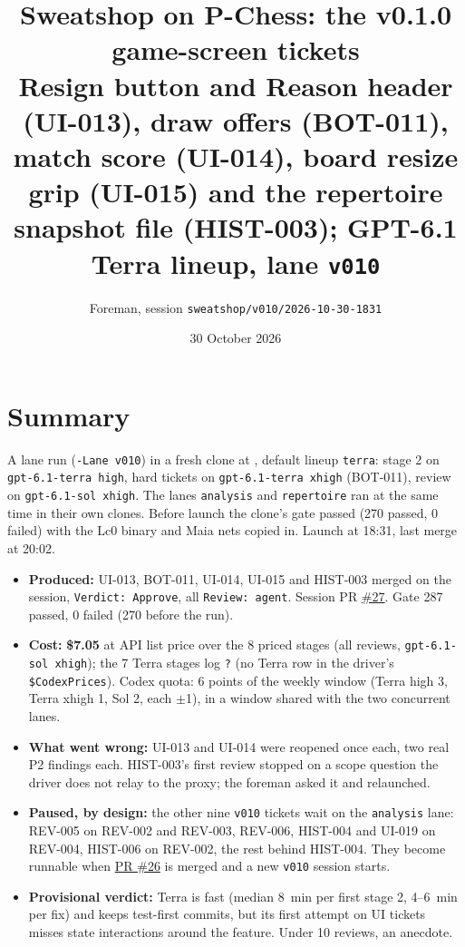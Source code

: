 \documentclass[11pt,a4paper]{article}
\title{Sweatshop on P-Chess: the v0.1.0 game-screen tickets\\\large Resign button and Reason header (UI-013), draw offers (BOT-011), match score (UI-014), board resize grip (UI-015) and the repertoire snapshot file (HIST-003); GPT-6.1 Terra lineup, lane \texttt{v010}}
\author{Foreman, session \texttt{sweatshop/v010/2026-10-30-1831}}
\date{30 October 2026}
\begin{document}
\maketitle

\section*{Summary}

A lane run (\texttt{-Lane v010}) in a fresh clone at , default
lineup \texttt{terra}: stage 2 on \texttt{gpt-6.1-terra high}, hard tickets on
\texttt{gpt-6.1-terra xhigh} (BOT-011), review on \texttt{gpt-6.1-sol xhigh}. The lanes
\texttt{analysis} and \texttt{repertoire} ran at the same time in their own clones. Before launch
the clone's gate passed (270 passed, 0 failed) with the Lc0 binary and Maia nets copied in.
Launch at 18:31, last merge at 20:02.

\begin{itemize}
  \item \textbf{Produced:} UI-013, BOT-011, UI-014, UI-015 and HIST-003 merged on the session,
        \texttt{Verdict: Approve}, all \texttt{Review: agent}. Session PR
        \href{https://github.com/Laginho/P-Chess/pull/27}{\#27}. Gate 287 passed, 0 failed
        (270 before the run).
  \item \textbf{Cost:} \textbf{\$7.05} at API list price over the 8 priced stages (all reviews,
        \texttt{gpt-6.1-sol xhigh}); the 7 Terra stages log \texttt{?} (no Terra row in the
        driver's \texttt{\$CodexPrices}). Codex quota: 6 points of the weekly window (Terra high
        3, Terra xhigh 1, Sol 2, each $\pm$1), in a window shared with the two concurrent lanes.
  \item \textbf{What went wrong:} UI-013 and UI-014 were reopened once each, two real P2
        findings each. HIST-003's first review stopped on a scope question the driver does not
        relay to the proxy; the foreman asked it and relaunched.
  \item \textbf{Paused, by design:} the other nine \texttt{v010} tickets wait on the
        \texttt{analysis} lane: REV-005 on REV-002 and REV-003, REV-006, HIST-004 and UI-019 on
        REV-004, HIST-006 on REV-002, the rest behind HIST-004. They become runnable when
        \href{https://github.com/Laginho/P-Chess/pull/26}{PR \#26} is merged and a new
        \texttt{v010} session starts.
  \item \textbf{Provisional verdict:} Terra is fast (median 8~min per first stage 2, 4--6~min
        per fix) and keeps test-first commits, but its first attempt on UI tickets misses state
        interactions around the feature. Under 10 reviews, an anecdote.
\end{itemize}
\end{document}

